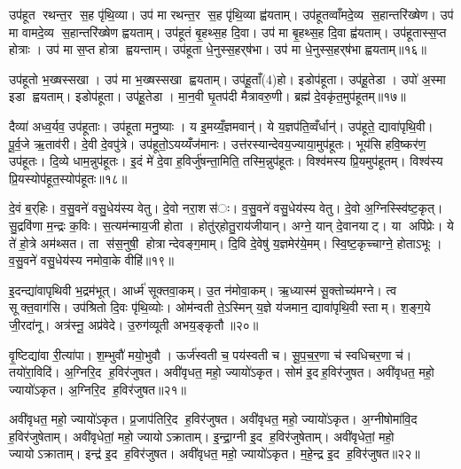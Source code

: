 
उप॑हूत रथन्त॒र स॒ह पृ॑थि॒व्या। उप॑ मा रथन्त॒र स॒ह पृ॑थि॒व्या ह्व॑यताम्। उप॑हूतव्वाँमदे॒व्य स॒हान्तरि॑ख्षेण। उप॑ मा वामदे॒व्य स॒हान्तरि॑ख्षेण ह्वयताम्। उप॑हूतं बृ॒हथ्स॒ह दि॒वा। उप॑ मा बृ॒हथ्स॒ह दि॒वा ह्व॑यताम्। उप॑हूतास्स॒प्त होत्राः। उप॑ मा स॒प्त होत्रा ह्वयन्ताम्। उप॑हूता धे॒नुस्स॒हर्‌ष॑भा। उप॑ मा धे॒नुस्स॒हर्‌ष॑भा ह्वयताम्॥१६॥

उप॑हूतो भ॒ख्षस्सखा। उप॑ मा भ॒ख्षस्सखा ह्वयताम्। उप॑हू॒ताँ(4)हो। इडोप॑हूता। उप॑हू॒तेडा। उपो॑ अ॒स्मा इडा ह्वयताम्। इडोप॑हूता। उप॑हू॒तेडा। मा॒न॒वी घृ॒तप॑दी मैत्रावरु॒णी। ब्रह्म॑ दे॒वकृ॑त॒मुप॑हूतम्॥१७॥

दैव्या॑ अध्व॒र्यव॒ उप॑हूताः। उप॑हूता मनु॒ष्याः। य इ॒मय्यँ॒ज्ञमवान्॑। ये य॒ज्ञप॑ति॒व्वँर्धान्॑। उप॑हूते॒ द्यावा॑पृथि॒वी। पू॒र्व॒जे ऋ॒ताव॑री। दे॒वी दे॒वपु॑त्रे। उप॑हूतो॒ऽयय्यँज॑मानः। उत्त॑रस्यान्देवय॒ज्याया॒मुप॑हूतः। भूय॑सि हवि॒ष्कर॑ण॒ उप॑हूतः। दि॒व्ये धाम॒न्नुप॑हूतः। इ॒दं मे॑ दे॒वा ह॒विर्जु॑षन्ता॒मिति॒ तस्मि॒न्नुप॑हूतः। विश्व॑मस्य प्रि॒यमुप॑हूतम्। विश्व॑स्य प्रि॒यस्योप॑हूत॒स्योप॑हूतः॥१८॥


दे॒वं ब॒र्‌हिः। व॒सु॒वने॑ वसु॒धेय॑स्य वेतु। दे॒वो नरा॒शस॑ः। व॒सु॒वने॑ वसु॒धेय॑स्य वेतु। दे॒वो अ॒ग्निस्स्वि॑ष्ट॒कृत्। सु॒द्रवि॑णा म॒न्द्रः क॒विः। स॒त्यम॑न्माय॒जी होता। होतु॑र्‌होतु॒राय॑जीयान्। अग्ने॒ यान् दे॒वानयाट्। या अपि॑प्रेः। ये ते॑ हो॒त्रे अम॑थ्सत। ता स॑स॒नुषी॒ होत्रान्देवङ्ग॒माम्। दि॒वि दे॒वेषु॑ य॒ज्ञमेर॑ये॒मम्। स्वि॒ष्ट॒कृच्चाग्ने॒ होताऽभूः। व॒सु॒वने॑ वसु॒धेय॑स्य नमोवा॒के वीहि॑॥१९॥


इ॒दन्द्या॑वापृथिवी भ॒द्रम॑भूत्। आर्ध्म॑ सूक्तवा॒कम्। उ॒त न॑मोवा॒कम्। ऋ॒ध्यास्म॑ सू॒क्तोच्य॑मग्ने। त्व सूक्त॒वाग॑सि। उप॑श्रितो दि॒वः पृ॑थि॒व्योः। ओम॑न्वती ते॒ऽस्मिन् य॒ज्ञे य॑जमान॒ द्यावा॑पृथि॒वी स्ताम्। श॒ङ्ग॒ये जी॒रदा॑नू। अत्र॑स्नू॒ अप्र॑वेदे। उ॒रुग॑व्यूती अभय॒ङ्कृतौ॥२०॥

वृ॒ष्टिद्या॑वा री॒त्या॑पा। श॒म्भुवौ॑ मयो॒भुवौ। ऊर्ज॑स्वती च॒ पय॑स्वती च। सू॒प॒च॒र॒णा च॑ स्वधिचर॒णा च॑। तयो॑रा॒विदि॑। अ॒ग्निरि॒द ह॒विर॑जुषत। अवी॑वृधत॒ महो॒ ज्यायो॑ऽकृत। सोम॑ इ॒दह॒विर॑जुषत। अवी॑वृधत॒ महो॒ ज्यायो॑ऽकृत। अ॒ग्निरि॒द ह॒विर॑जुषत॥२१॥

अवी॑वृधत॒ महो॒ ज्यायो॑ऽकृत। प्र॒जाप॑तिरि॒द ह॒विर॑जुषत। अवी॑वृधत॒ महो॒ ज्यायो॑ऽकृत। अ॒ग्नीषोमा॑वि॒द ह॒विर॑जुषेताम्। अवी॑वृधेतां॒ महो॒ ज्यायोऽक्राताम्। इ॒न्द्रा॒ग्नी इ॒द ह॒विर॑जुषेताम्। अवी॑वृधेतां॒ महो॒ ज्यायोऽक्राताम्। इन्द्र॑ इ॒द ह॒विर॑जुषत। अवी॑वृधत॒ महो॒ ज्यायो॑ऽकृत। म॒हे॒न्द्र इ॒द ह॒विर॑जुषत॥२२॥


